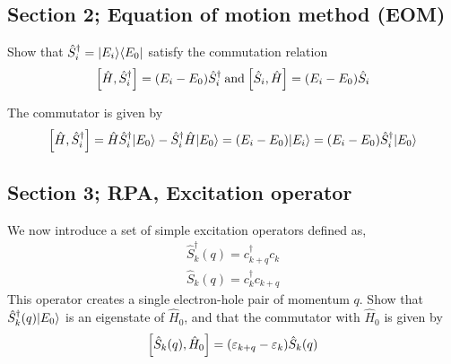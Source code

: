 \subsection{Section 2; Equation of motion method (EOM)}
\begin{exercise}
Show that $\hat{S}_{i}^{\dagger} = |E_i\rangle\langle E_0 |$ satisfy the commutation relation
\begin{equation}\label{eq:4e2}
    \comm{\hat{H}}{\hat{S}_{i}^{\dagger}} = (E_i - E_0)\hat{S}_{i}^{\dagger} \: \textrm{and} \: \comm{\hat{S}_{i}}{\hat{H}} = (E_i - E_0)\hat{S}_{i} 
\end{equation}
\end{exercise}

\begin{solution}
The commutator is given by
\begin{equation}
    \comm{\hat{H}}{\hat{S}_{i}^{\dagger}} = \hat{H} \hat{S}_i^{\dagger} \ket{E_0} - \hat{S}_i^{\dagger} \hat{H} \ket{E_0} = (E_i-E_0) \ket{E_i} = (E_i-E_0) \hat{S}_i^{\dagger} \ket{E_0}
\end{equation}
\end{solution}

\subsection{Section 3; RPA, Excitation operator}

\begin{exercise}
    We now introduce a set of simple excitation operators defined as,
    \begin{align}
        \hat{S}_k^{\dagger}(q) = c_{k+q}^{\dagger} c_k \\
        \hat{S}_k(q) = c_{k}^{\dagger} c_{k+q}
    \end{align}
    This operator creates a single electron-hole pair of momentum $q$. Show that \\$ \hat{S}_k^{\dagger}(q) |E_0\rangle$ is an eigenstate of $\hat{H}_0$, and  that the commutator with  $\hat{H}_0$ is given
by
\begin{equation}
    \comm{\hat{S}_k(q)}{\hat{H}_0} = (\varepsilon_{k+q}-\varepsilon_k) \hat{S}_k(q)
\end{equation}
\end{exercise}



